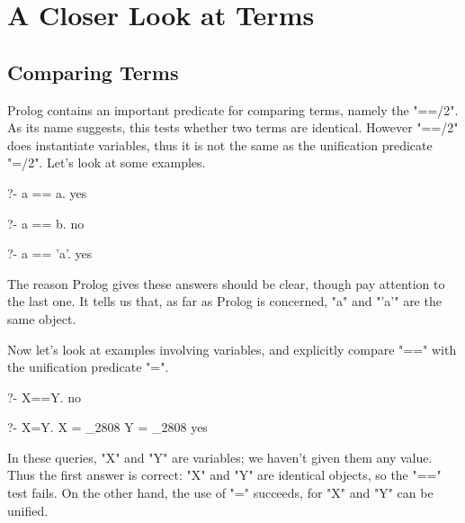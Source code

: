 
\chapter{A Closer Look at Terms}\label{CHAPTER9}


\section{Comparing Terms}\label{SEC.L9.COMPARING.TERMS}



Prolog contains an important predicate for comparing terms, namely the
 "==/2". As its name suggests, this tests
whether two terms are identical.  However "==/2" does 
instantiate variables, thus it is not the same as the unification
predicate "=/2". Let's look at some
examples.
\begin{LPNcodedisplay}
?- a == a.
yes

?- a == b.
no

?- a == 'a'.
yes
\end{LPNcodedisplay}
The reason Prolog gives these answers should be clear, though pay
attention to the last one.  It tells us that, as far as Prolog is
concerned, "a" and "'a'" are the same object.

Now let's look at examples involving variables, and explicitly compare
"==" with the unification predicate "=".

\begin{LPNcodedisplay}
?- X==Y.
no

?- X=Y.
X = _2808
Y = _2808
yes
\end{LPNcodedisplay}
In these queries, "X" and "Y" are 
variables; we haven't given them any value.  Thus the first answer is
correct: "X" and "Y" are  identical objects, so the
"==" test fails.  On the other hand, the use of "=" succeeds,
for "X" and "Y" can be unified.

